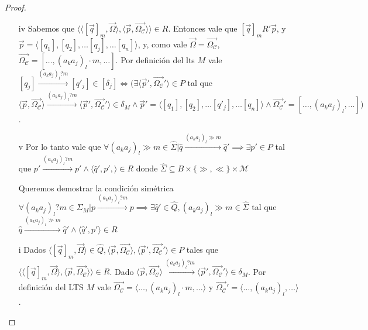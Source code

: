 \begin{proof}
\begin{itemize}
    \item[iv] Sabemos que $\langle \langle [\overrightarrow{q}]_m, \overrightarrow{\Omega} \rangle, \langle \overrightarrow{p}, \overrightarrow{\Omega_\mathcal{C}} \rangle \rangle \in R$. Entonces vale que $[\overrightarrow{q}]_mR'\overrightarrow{p}$, y $\overrightarrow{p} = \langle [q_1], [q_2], \ldots [q_j], \ldots [q_n] \rangle$, y, como vale $\overrightarrow{\Omega}=\overrightarrow{\Omega_\mathcal{C}}$, $\overrightarrow{\Omega_\mathcal{C}} = [\ldots, (a_ka_j)_l \cdot m, \ldots]$. Por definición del lts $M$ vale $[q_j] \xrightarrow{(a_ka_j)_l?m} [q'_j] \in [\delta_j]  \iff (\exists \langle \overrightarrow{p}', \overrightarrow{\Omega_\mathcal{C}}' \rangle \in P$ tal que $\langle \overrightarrow{p}, \overrightarrow{\Omega_\mathcal{C}} \rangle \xrightarrow{(a_ka_j)_l?m} \langle \overrightarrow{p}', \overrightarrow{\Omega_\mathcal{C}}' \rangle \in \delta_M \land \overrightarrow{p}'= \langle [q_1], [q_2], \ldots [q'_j], \ldots [q_n] \rangle \land \overrightarrow{\Omega_\mathcal{C}}'= [\ldots, (a_ka_j)_l, \ldots])$.
    
    \item[v] Por lo tanto vale que $\forall (a_ka_j)_l \gg m \in \hat{\Sigma} | \hat{q} \xrightarrow{(a_ka_j)_l \gg m} \hat{q}' \implies \exists p' \in P$ tal que $p' \xrightarrow{(a_ka_j)_l?m} p' \land \langle \hat{q}', p', \rangle \in R$ donde $\hat{\Sigma} \subseteq B \times \{\gg,\ll\} \times \mathcal{M}$
    
    \item[] Queremos demostrar la condición simétrica $\forall (a_ka_j)_l?m \in \Sigma_M | p \xrightarrow{(a_ka_j)_l?m} p \implies \exists \hat{q}' \in \hat{Q}, (a_ka_j)_l \gg m \in \hat{\Sigma}$ tal que $\hat{q} \xrightarrow{(a_ka_j)_l \gg m} \hat{q}' \land \langle \hat{q}', p'\rangle \in R$
    
    \item[i]Dados $\langle [\overrightarrow{q}]_m, \overrightarrow{\Omega} \rangle \in \hat{Q}, \langle \overrightarrow{p}, \overrightarrow{\Omega_\mathcal{C}} \rangle, \langle \overrightarrow{p}', \overrightarrow{\Omega_\mathcal{C}}' \rangle \in P$ tales que $\langle \langle [\overrightarrow{q}]_m, \overrightarrow{\Omega} \rangle, \langle \overrightarrow{p}, \overrightarrow{\Omega_\mathcal{C}} \rangle \rangle \in R$. Dado $\langle \overrightarrow{p}, \overrightarrow{\Omega_\mathcal{C}} \rangle \xrightarrow{(a_ka_j)_l?m} \langle \overrightarrow{p}', \overrightarrow{\Omega_\mathcal{C}}' \rangle \in \delta_M$. Por definición del LTS $M$ vale $\overrightarrow{\Omega_{\mathcal{C}}}= \langle \ldots,(a_ka_j)_l \cdot m, \ldots \rangle$ y $\overrightarrow{\Omega_{\mathcal{C}}}'= \langle \ldots,(a_ka_j)_l, \ldots \rangle$.
    

\end{itemize}
\end{proof}
